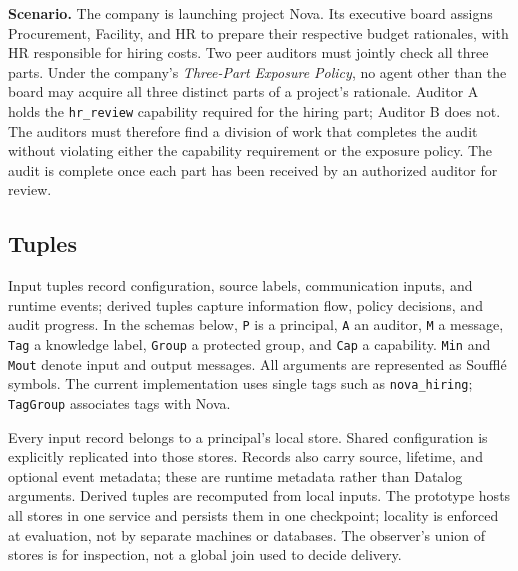 \documentclass[10pt]{article}
\begin{document}
\textbf{Scenario.} The company is launching project Nova. Its executive board assigns
Procurement, Facility, and HR to prepare their respective budget rationales, with HR
responsible for hiring costs. Two peer auditors must jointly check all three parts.
Under the company's \emph{Three-Part Exposure Policy}, no agent other than the board may
acquire all three distinct parts of a project's rationale. Auditor A holds the
\texttt{hr\_review} capability required for the hiring part; Auditor B does not. The
auditors must therefore find a division of work that completes the audit without
violating either the capability requirement or the exposure policy. The audit is
complete once each part has been received by an authorized auditor for review.

\subsection{Tuples}

Input tuples record configuration, source labels, communication inputs, and runtime
 events; derived tuples capture information flow, policy decisions, and audit progress.
In the schemas below, \texttt{P} is a principal, \texttt{A} an auditor, \texttt{M} a
message, \texttt{Tag} a knowledge label, \texttt{Group} a protected group, and
\texttt{Cap} a capability. \texttt{Min} and \texttt{Mout} denote input and output messages.
All arguments are represented as Souffl\'e symbols. The current implementation uses
single tags such as \texttt{nova\_hiring}; \texttt{TagGroup} associates tags with Nova.

Every input record belongs to a principal's local store. Shared configuration is
explicitly replicated into those stores. Records also carry source, lifetime, and
optional event metadata; these are runtime metadata rather than Datalog arguments.
Derived tuples are recomputed from local inputs. The prototype hosts all stores in
one service and persists them in one checkpoint; locality is enforced at evaluation,
not by separate machines or databases. The observer's union of stores is for inspection,
not a global join used to decide delivery.
\end{document}
